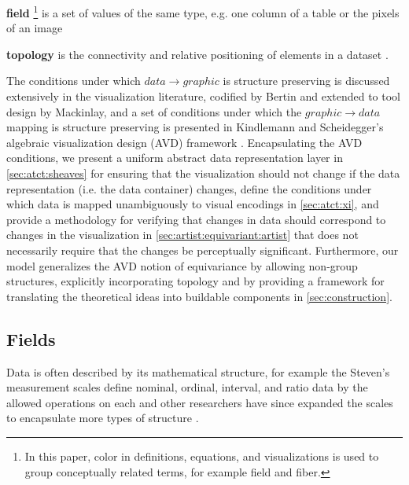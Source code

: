 \documentclass[journal]{IEEEtran}
\theoremstyle{definition}
\theoremstyle{remark}
\begin{document}
\begin{LaTeXdescription}
  \item[\textcolor{fiber}{\textbf{field}}]\footnote{In this paper, color in definitions, equations, and visualizations is used to group conceptually related terms\cite{headMathAugmentationHow2022}, for example \textcolor{fiber}{field} and \textcolor{fiber}{fiber}.} is a set of values of the same type, e.g. one column of a table or the pixels of an image
  \item[\textcolor{base}{\textbf{topology}}] is the connectivity and relative positioning of elements in a dataset \cite{wilkinsonGrammarGraphics2005}.
\end{LaTeXdescription}

The conditions under which $data \rightarrow graphic$ is structure preserving is discussed extensively in the visualization literature, codified by Bertin\cite{bertinSemiologyGraphicsDiagrams2011} and extended to tool design by Mackinlay\cite{mackinlayAutomaticDesignGraphical1987}, and a set of conditions under which the $graphic \rightarrow data$ mapping is structure preserving is presented in Kindlemann and Scheidegger's algebraic visualization design (AVD) framework \cite{kindlmannAlgebraicProcessVisualization2014}. Encapsulating the AVD conditions, we present a uniform abstract data representation layer in \autoref{sec:atct:sheaves} for ensuring that the visualization should not change if the data representation (i.e. the data container) changes, define the conditions under which data is mapped unambiguously to visual encodings \cite{ziemkiewiczEmbeddingInformationVisualization2009} in \autoref{sec:atct:xi}, and provide a methodology for verifying that changes in data should correspond to changes in the visualization in \autoref{sec:artist:equivariant:artist} that does not necessarily require that the changes be perceptually significant. Furthermore, our model generalizes the AVD notion of equivariance by allowing non-group structures, explicitly incorporating topology and by providing a framework for translating the theoretical ideas into buildable components in \autoref{sec:construction}.

\subsection{Fields}
\label{sec:related-work:equivariance}

Data is often described by its mathematical structure, for example the Steven's measurement scales define nominal, ordinal, interval, and ratio data by the allowed operations on each \cite{stevensTheoryScalesMeasurement1946} and other researchers have since expanded the scales to encapsulate more types of structure \cite{leaFormalizationMeasurementScale1971, thomasMathematizationNotMeasurement2014}.
\end{document}
